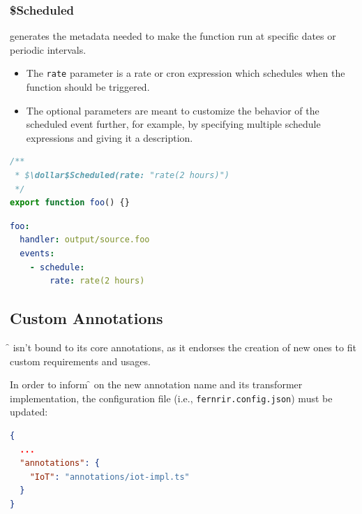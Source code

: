 \subsubsection{\$Scheduled}
generates the metadata needed to make the function run at specific dates or periodic intervals.
\begin{itemize}
  \item The \verb|rate| parameter is a rate or cron expression
    which schedules when the function should be triggered.
  \item The optional parameters are meant to customize the behavior of the scheduled event further,
     for example, by specifying multiple schedule expressions and giving it a description.
\end{itemize}
\begin{multicols}{2}[\columnsep=2cm]
\begin{lstlisting}[language=javascript]
/**
 * $\dollar$Scheduled(rate: "rate(2 hours)")
 */
export function foo() {}
\end{lstlisting}
\columnbreak

\begin{lstlisting}[language=yaml]
foo:
  handler: output/source.foo
  events:
    - schedule:
        rate: rate(2 hours)
\end{lstlisting}
\end{multicols}

\subsection{Custom Annotations}

\f{} isn't bound to its core annotations, as it endorses the creation of new ones
to fit custom requirements and usages.

In order to inform \f{} on the new annotation name and its transformer implementation,
the configuration file (i.e., \verb|fernrir.config.json|) must be updated:
\begin{lstlisting}[language=json]
{
  ...
  "annotations": {
    "IoT": "annotations/iot-impl.ts"
  }
}
\end{lstlisting}

